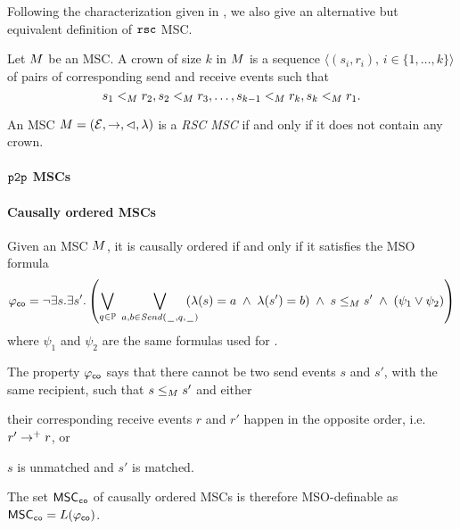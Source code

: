 \medskip

Following the characterization given in \cite[Theorem 4.4]{DBLP:journals/dc/Charron-BostMT96}, we also give an alternative but equivalent definition of $\mathtt{rsc}$ MSC.

\begin{definition}
	Let $M$ be an MSC. A crown of size $k$ in $M$ is a sequence $\langle(s_i,r_i),\, i \in \{1,\dots,k\}\rangle$ of pairs of corresponding send and receive events such that
	\[
		s_1 <_M r_2, s_2 <_M r_3, \dots, s_{k-1} <_M r_k, s_k <_M r_1.
	\]
\end{definition}

\begin{definition} \label{def:rsc_alt}
	An MSC $M = (\mathcal{E},\to,\lhd,\lambda)$ is a \emph{RSC MSC} if and only if it does not contain any crown.
\end{definition}



\paragraph*{$\mathtt{p2p}$ MSCs}
	

\paragraph*{Causally ordered MSCs}
Given an MSC $M$, it is causally ordered if and only if it satisfies the MSO formula
\[
	\varphi_{\mathsf{co}} = \neg \exists s.\exists s'. \left(
	\bigvee_{\substack{q \in \mathbb{P}}}\;
	\bigvee_{\substack{a,b \in {\mathit{Send}(\hspace{0.1em}\underline{\hspace{0.5em}}\hspace{0.1em},q,\hspace{0.1em}\underline{\hspace{0.5em}}\hspace{0.1em})}}}\hspace{-1em}
	(\lambda(s) = a \;\wedge\; \lambda(s') = b) \;\wedge\; s \le_M s' \;\wedge\;
	(\psi_1 \vee \psi_2 ) 	
	\right)
\]
where $\psi_1$ and $\psi_2$ are the same formulas used for \pp.

The property $\varphi_{\mathsf{co}}$ says that there cannot be two send events $s$ and $s'$, with the same recipient, such that $s \le_M s'$ and either
\begin{enumerate*}[label={(\roman*)}]
	\item their corresponding receive events $r$ and $r'$ happen in the opposite order, i.e. $r' \to^+ r$, or
	\item $s$ is unmatched and $s'$ is matched.
\end{enumerate*}
The set $\mathsf{MSC}_{\mathtt{co}}$ of causally ordered MSCs is therefore MSO-definable as $\mathsf{MSC}_{\mathtt{co}}=L(\varphi_{\mathsf{co}})$.


